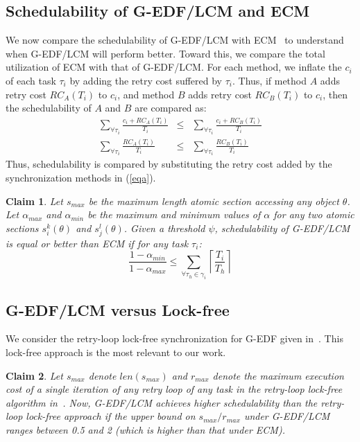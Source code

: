 \documentclass{sig-alternate}
\newtheorem{clm}{Claim}
\begin{document}
\subsection{Schedulability of G-EDF/LCM and ECM}
\label{performance g-edf-lcm}
We now compare the schedulability of G-EDF/LCM with ECM~\cite{stmconcurrencycontrol:emsoft11} %
to understand when G-EDF/LCM will perform better. 
Toward this, we compare the total utilization of ECM with that of G-EDF/LCM. For each method, we inflate the $c_i$ of each task $\tau_i$ by adding the retry cost suffered by $\tau_i$. Thus, if method $A$ adds retry cost $RC_A(T_i)$ to $c_i$, and method $B$ adds retry cost $RC_B(T_i)$ to $c_i$, then the schedulability of $A$ and $B$ are compared as:
\begin{eqnarray}
\sum_{\forall \tau_{i}}\frac{c_{i}+RC_A(T_{i})}{T_{i}} & \le & \sum_{\forall \tau_{i}}\frac{c_{i}+RC_B(T_{i})}{T_{i}}\nonumber\\
\sum_{\forall \tau_{i}}\frac{RC_A(T_{i})}{T_{i}} & \le & \sum_{\forall \tau_{i}}\frac{RC_B(T_{i})}{T_{i}}
\label{eqa}\end{eqnarray}
Thus, schedulability is compared by substituting the retry cost added by the synchronization methods in (\ref{eqa}).

\begin{clm}\label{lcm versus ecm}
Let $s_{max}$ be the maximum length atomic section accessing any object $\theta$. Let $\alpha_{max}$ and $\alpha_{min}$ be the maximum and minimum values of $\alpha$ for any two atomic sections $s_i^k(\theta)$ and $s_j^l(\theta)$. Given a threshold $\psi$, schedulability of G-EDF/LCM is equal or better than ECM if for any task $\tau_i$:
\begin{equation}
\frac{1-\alpha_{min}}{1-\alpha_{max}} \le \sum_{\forall \tau_h \in \gamma_i}\left\lceil\frac{T_i}{T_h}\right\rceil
\label{edf-lcm-ecm}\end{equation}
\end{clm}

\subsection{G-EDF/LCM versus Lock-free}
\label{gedf-lcm-lock-free}
We consider the retry-loop lock-free synchronization for G-EDF given in~\cite{key-5}. This lock-free approach is the most relevant to our work. 

\begin{clm}\label{gedf-lcm-lock-free_clm} 
Let $s_{max}$ denote $len(s_{max})$ and $r_{max}$ denote the maximum execution cost of a single iteration of any retry loop of any task in the retry-loop lock-free algorithm in~\cite{key-5}. Now, G-EDF/LCM achieves higher schedulability than the retry-loop lock-free approach if the upper bound on $s_{max}/r_{max}$ under G-EDF/LCM ranges between 0.5 and 2 (which is higher than that under  ECM). 
\end{clm}
\end{document}
